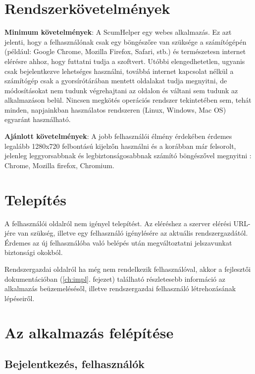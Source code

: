 \newpage

\section{Rendszerkövetelmények} %

\textbf{Minimum követelmények}: A ScumHelper egy webes alkalmazás. Ez azt jelenti, hogy a felhasználónak csak egy böngészőre van szüksége a számítógépén (például: Google Chrome, Mozilla Firefox, Safari, stb.) és természetesn internet elérésre ahhoz, hogy futtatni tudja a szoftvert. Utóbbi elengedhetetlen, ugyanis csak bejelentkezve lehetséges használni, továbbá internet kapcsolat nélkül a számítógép csak a gyorsírótárában mentett oldalakat tudja megnyitni, de módosításokat nem tudunk végrehajtani az oldalon és váltani sem tudunk az alkalmazáson belül. Nincsen megkötés operációs rendszer tekintetében sem, tehát minden, napjainkban használatos rendszeren (Linux, Windows, Mac OS) egyaránt használható.  

\textbf{Ajánlott követelmények}: A jobb felhasználói élmény érdekében érdemes legalább 1280x720 felbontású kijelzőn használni és a korábban már felsorolt, jelenleg leggyorsabbnak és legbiztonságosabbnak számító böngészővel megnyitni : Chrome, Mozilla firefox, Chromium.

\section{Telepítés}

A felhasználói oldalról nem igényel telepítést. Az eléréshez a szerver elérési URL-jére van szükség, illetve egy felhasználó igénylésére az aktuális rendszergazdától. Érdemes az új felhasználóba való belépés után megváltoztatni jelszavunkat biztonsági okokból.

Rendszergazdai oldalról ha még nem rendelkezik felhasználóval, akkor a fejlesztői dokumentációban (\ref{ch:impl}. fejezet) található részletesebb információ az alkalmazás beüzemelésésől, illetve rendszergazdai felhasználó létrehozásának lépéseiről. 

\newpage

\section{Az alkalmazás felépítése}

\subsection{Bejelentkezés, felhasználók}

